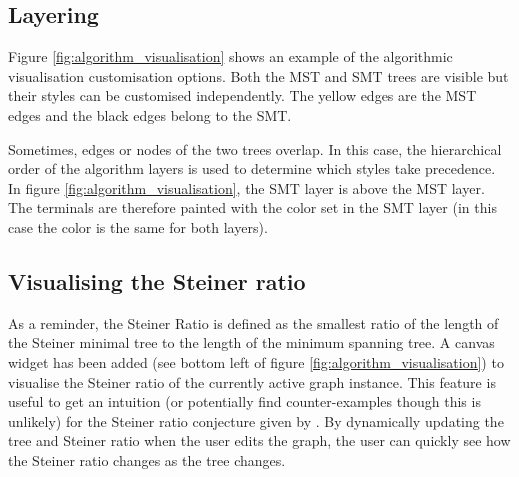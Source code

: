 \documentclass{l4proj}
\begin{document}
\subsection{Layering}
Figure \ref{fig:algorithm_visualisation} shows an example of the algorithmic visualisation customisation options. Both the MST and SMT trees are visible but their styles can be customised independently. The yellow edges are the MST edges and the black edges belong to the SMT.

Sometimes, edges or nodes of the two trees overlap. In this case, the hierarchical order of the algorithm layers is used to determine which styles take precedence. In figure \ref{fig:algorithm_visualisation}, the SMT layer is above the MST layer. The terminals are therefore painted with the color set in the SMT layer (in this case the color is the same for both layers).
\subsection{Visualising the Steiner ratio}
As a reminder, the Steiner Ratio is defined as the smallest ratio of the length of the Steiner minimal tree to the length of the minimum spanning tree.
A canvas widget has been added (see bottom left of figure \ref{fig:algorithm_visualisation}) to visualise the Steiner ratio of the currently active graph instance.
This feature is useful to get an intuition (or potentially find counter-examples though this is unlikely) for the Steiner ratio conjecture given by \cite{Gilbert1968SteinerMT}. By dynamically updating the tree and Steiner ratio when the user edits the graph, the user can quickly see how the Steiner ratio changes as the tree changes.
\end{document}
